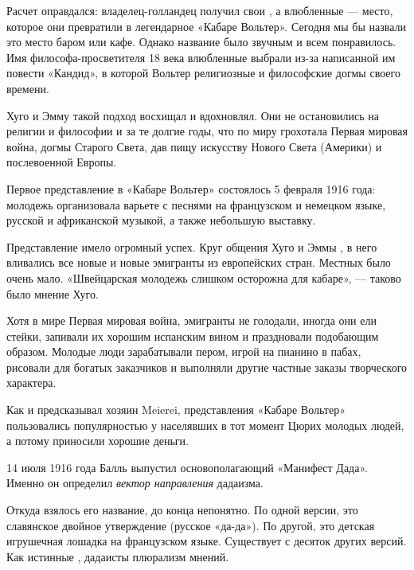Расчет оправдался: владелец-голландец получил свои , а влюбленные --- место, которое они превратили в легендарное «Кабаре Вольтер». Сегодня мы бы назвали это место баром или кафе. Однако название было звучным и всем понравилось. Имя философа-просветителя 18 века влюбленные выбрали из-за написанной им повести «Кандид», в которой Вольтер  религиозные и философские догмы своего времени.

Хуго и Эмму такой подход восхищал и вдохновлял. Они не остановились на религии и философии и за те долгие годы, что по миру грохотала Первая мировая война,  догмы Старого Света, дав пищу искусству Нового Света (Америки) и послевоенной Европы.

Первое представление в «Кабаре Вольтер» состоялось 5 февраля 1916 года: молодежь организовала варьете с песнями на французском и немецком языке, русской и африканской музыкой, а также небольшую выставку.

Представление имело огромный успех. Круг общения Хуго и Эммы , в него вливались все новые и новые эмигранты из европейских стран. Местных было очень мало. «Швейцарская молодежь слишком осторожна для кабаре», --- таково было мнение Хуго.

Хотя в мире  Первая мировая война, эмигранты не голодали, иногда они ели стейки, запивали их хорошим испанским вином и праздновали подобающим образом. Молодые люди зарабатывали пером, игрой на пианино в пабах, рисовали для богатых заказчиков и выполняли другие частные заказы творческого характера.

Как и предсказывал хозяин Meierei, представления «Кабаре Вольтер» пользовались популярностью у населявших в тот момент Цюрих молодых людей, а потому приносили хорошие деньги.

14 июля 1916 года Балль выпустил основополагающий «Манифест Дада». Именно он определил \textit{вектор направления} дадаизма.

Откуда взялось его название, до конца непонятно. По одной версии, это славянское двойное утверждение (русское «да-да»). По другой, это детская игрушечная лошадка на французском языке. Существует с десяток других версий. Как истинные , дадаисты  плюрализм мнений.

